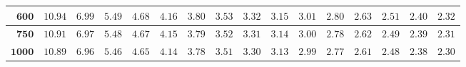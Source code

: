 \begin{customTableWrapper}{1.4}
\begin{longtable}{|r|r|r|r|r|r|r|r|r|r|r|r|r|r|r|r|}
    ${\mathbf{600}}$  & ${10.94}$   & ${6.99}$   & ${5.49}$   & ${4.68}$   & ${4.16}$   & ${3.80}$   & ${3.53}$   & ${3.32}$   & ${3.15}$   & ${3.01}$   & ${2.80}$   & ${2.63}$   & ${2.51}$   & ${2.40}$   & ${2.32}$   \\ \hline 
    ${\mathbf{750}}$  & ${10.91}$   & ${6.97}$   & ${5.48}$   & ${4.67}$   & ${4.15}$   & ${3.79}$   & ${3.52}$   & ${3.31}$   & ${3.14}$   & ${3.00}$   & ${2.78}$   & ${2.62}$   & ${2.49}$   & ${2.39}$   & ${2.31}$   \\ \hline 
    ${\mathbf{1000}}$  & ${10.89}$   & ${6.96}$   & ${5.46}$   & ${4.65}$   & ${4.14}$   & ${3.78}$   & ${3.51}$   & ${3.30}$   & ${3.13}$   & ${2.99}$   & ${2.77}$   & ${2.61}$   & ${2.48}$   & ${2.38}$   & ${2.30}$   \\ \hline
\end{longtable}
\end{customTableWrapper}
\changefontsizes{11pt}

\setlength{\LTleft}{0in} %
\setlength{\LTright}{0in} %


\newpage

